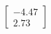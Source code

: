 \documentclass[preview]{standalone}
\begin{document}
\begin{align*}
\begin{bmatrix} -4.47 \\ 2.73 \end{bmatrix}
\end{align*}
\end{document}
